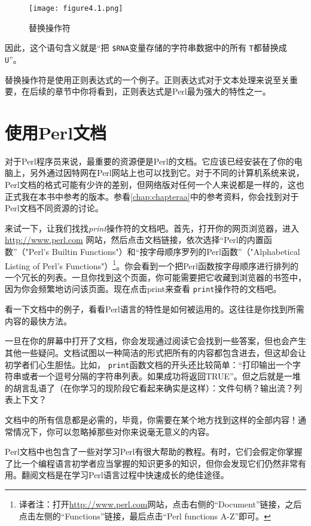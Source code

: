 \begin{figure}
  \centering
  \texttt{[image: figure4.1.png]}
  \caption{替换操作符}
  \label{fig:figure4.1}
\end{figure}

因此，这个语句含义就是“把 \verb|$RNA|变量存储的字符串数据中的所有 \verb|T|都替换成 \verb|U|”。

替换操作符是使用正则表达式的一个例子。正则表达式对于文本处理来说至关重要，在后续的章节中你将看到，正则表达式是Perl最为强大的特性之一。

\section{使用Perl文档}
对于Perl程序员来说，最重要的资源便是Perl的文档。它应该已经安装在了你的电脑上，另外通过因特网在Perl网站上也可以找到它。对于不同的计算机系统来说，Perl文档的格式可能有少许的差别，但网络版对任何一个人来说都是一样的，这也正式我在本书中参考的版本。参看\autoref{chap:chapteraa}中的参考资料，你会找到对于Perl文档不同资源的讨论。

来试一下，让我们找找\textit{print}操作符的文档吧。首先，打开你的网页浏览器，进入 \href{http://www.perl.com}{http://www.perl.com} 网站，然后点击文档链接，依次选择“Perl的内置函数”（"Perl's Builtin Functions"）和“按字母顺序罗列的Perl函数”（"Alphabetical Listing of Perl's Functions"）\footnote{译者注：打开\href{http://www.perl.com}{http://www.perl.com}网站，点击右侧的“Document”链接，之后点击左侧的“Functions”链接，最后点击“Perl functions A-Z”即可。}。你会看到一个把Perl函数按字母顺序进行排列的一个冗长的列表。一旦你找到这个页面，你可能需要把它收藏到浏览器的书签中，因为你会频繁地访问该页面。现在点击print来查看 \verb|print|操作符的文档吧。

看一下文档中的例子，看看Perl语言的特性是如何被运用的。这往往是你找到所需内容的最快方法。

一旦在你的屏幕中打开了文档，你会发现通过阅读它会找到一些答案，但也会产生其他一些疑问。文档试图以一种简洁的形式把所有的内容都包含进去，但这却会让初学者们心生胆怯。比如， \verb|print|函数文档的开头还比较简单：“打印输出一个字符串或者一个逗号分隔的字符串列表。如果成功将返回TRUE”。但之后就是一堆的胡言乱语了（在你学习的现阶段它看起来确实是这样）：文件句柄？输出流？列表上下文？

文档中的所有信息都是必需的，毕竟，你需要在某个地方找到这样的全部内容！通常情况下，你可以忽略掉那些对你来说毫无意义的内容。

Perl文档中也包含了一些对学习Perl有很大帮助的教程。有时，它们会假定你掌握了比一个编程语言初学者应当掌握的知识更多的知识，但你会发现它们仍然非常有用。翻阅文档是在学习Perl语言过程中快速成长的绝佳途径。

